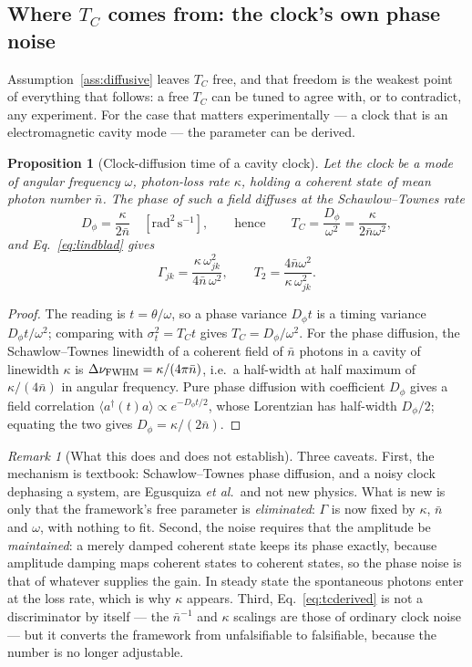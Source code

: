 \documentclass[aps,prd,onecolumn,notitlepage,10pt,amsmath,amssymb,amsfonts,nofootinbib]{revtex4-2}
\newtheorem{proposition}{Proposition}
\theoremstyle{definition}
\theoremstyle{remark}
\newtheorem{remark}{Remark}
\begin{document}
\subsection{Where $T_C$ comes from: the clock's own phase noise}
\label{sec:tc}
Assumption~\ref{ass:diffusive} leaves $T_C$ free, and that freedom is the weakest point of everything that follows: a free $T_C$ can be tuned to agree with, or to contradict, any experiment. For the case that matters experimentally --- a clock that is an electromagnetic cavity mode --- the parameter can be derived.

\begin{proposition}[Clock-diffusion time of a cavity clock]
\label{prop:tc}
Let the clock be a mode of angular frequency $\omega$, photon-loss rate $\kappa$, holding a coherent state of mean photon number $\bar n$. The phase of such a field diffuses at the Schawlow--Townes rate
\[
  D_\phi=\frac{\kappa}{2\bar n}\quad[\mathrm{rad}^2\,\mathrm{s}^{-1}],
  \qquad\text{hence}\qquad
  T_C=\frac{D_\phi}{\omega^2}=\frac{\kappa}{2\bar n\omega^2},
\]
and Eq.~\eqref{eq:lindblad} gives
\begin{equation}
  \Gamma_{jk}=\frac{\kappa\,\omega_{jk}^2}{4\bar n\,\omega^2},\qquad
  T_2=\frac{4\bar n\omega^2}{\kappa\,\omega_{jk}^2}.
  \label{eq:tcderived}
\end{equation}
\end{proposition}
\begin{proof}
The reading is $t=\theta/\omega$, so a phase variance $D_\phi t$ is a timing variance $D_\phi t/\omega^2$; comparing with $\sigma_t^2=T_Ct$ gives $T_C=D_\phi/\omega^2$. For the phase diffusion, the Schawlow--Townes linewidth of a coherent field of $\bar n$ photons in a cavity of linewidth $\kappa$ is $\Delta\nu_{\rm FWHM}=\kappa/(4\pi\bar n)$, i.e.\ a half-width at half maximum of $\kappa/(4\bar n)$ in angular frequency. Pure phase diffusion with coefficient $D_\phi$ gives a field correlation $\langle a^\dagger(t)a\rangle\propto e^{-D_\phi t/2}$, whose Lorentzian has half-width $D_\phi/2$; equating the two gives $D_\phi=\kappa/(2\bar n)$.
\end{proof}

\begin{remark}[What this does and does not establish]
\label{rem:tcscope}
Three caveats. First, the mechanism is textbook: Schawlow--Townes phase diffusion, and a noisy clock dephasing a system, are Egusquiza \emph{et al.}~and not new physics. What is new is only that the framework's free parameter is \emph{eliminated}: $\Gamma$ is now fixed by $\kappa$, $\bar n$ and $\omega$, with nothing to fit. Second, the noise requires that the amplitude be \emph{maintained}: a merely damped coherent state keeps its phase exactly, because amplitude damping maps coherent states to coherent states, so the phase noise is that of whatever supplies the gain. In steady state the spontaneous photons enter at the loss rate, which is why $\kappa$ appears. Third, Eq.~\eqref{eq:tcderived} is not a discriminator by itself --- the $\bar n^{-1}$ and $\kappa$ scalings are those of ordinary clock noise --- but it converts the framework from unfalsifiable to falsifiable, because the number is no longer adjustable.
\end{remark}
\end{document}
